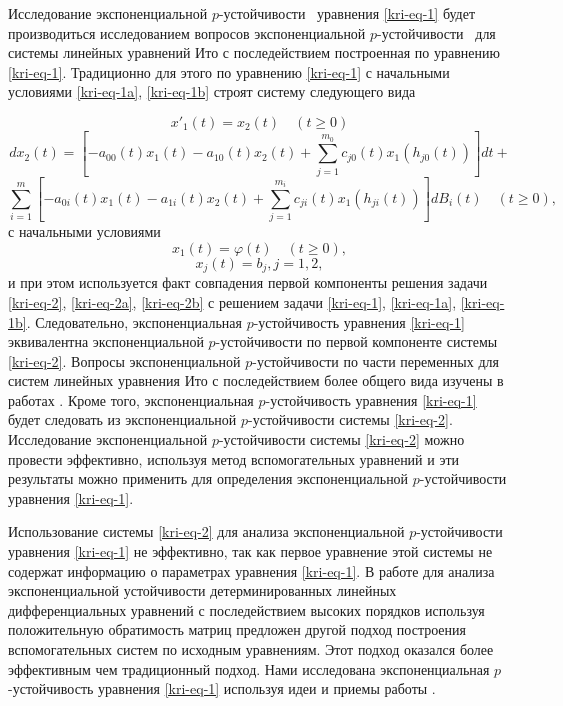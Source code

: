 Исследование экспоненциальной  $p${}-устойчивости \ уравнения \eqref{kri-eq-1} будет производиться исследованием вопросов
экспоненциальной  $p${}-устойчивости \ для системы линейных уравнений Ито с последействием построенная по уравнению
\eqref{kri-eq-1}. Традиционно для этого по уравнению \eqref{kri-eq-1} с начальными условиями \eqref{kri-eq-1a}, \eqref{kri-eq-1b} строят систему следующего вида

\begin{equation*}
	x'_1(t) = x_2(t)\quad(t\ge0)
\end{equation*}
\begin{equation}\label{kri-eq-2}
	dx_2(t) = \left[-a_{00}(t)x_1(t) - a_{10}(t)x_2(t) + \sum_{j=1}^{m_0}c_{j0}(t)x_1(h_{j0}(t))\right]dt +
\end{equation}
\begin{equation*}
	\sum_{i=1}^{m} \left[-a_{0i}(t)x_1(t)-a_{1i}(t)x_2(t)+\sum_{j=1}^{m_i}c_{ji}(t)x_1(h_{ji}(t))\right]dB_i(t) \quad (t \ge 0),
\end{equation*}
с начальными условиями
\begin{equation}\label{kri-eq-2a}
	x_1(t)=\varphi (t)\quad(t\ge 0),
\end{equation}
\begin{equation}\label{kri-eq-2b}
	x_j(t)=b_j, j=1,2,
\end{equation}
и при этом используется факт совпадения первой компоненты решения задачи \eqref{kri-eq-2}, \eqref{kri-eq-2a}, \eqref{kri-eq-2b} с решением задачи \eqref{kri-eq-1}, \eqref{kri-eq-1a},
\eqref{kri-eq-1b}. Следовательно, экспоненциальная  $p$-\linebreak устойчивость уравнения \eqref{kri-eq-1} эквивалентна экспоненциальной
$p${}-устойчивости по первой компоненте системы \eqref{kri-eq-2}. Вопросы экспоненциальной  $p${}-устойчивости по части переменных
для систем линейных уравнения Ито с последействием более общего вида изучены в работах \cite{kri-bib-19, kri-bib-20}. Кроме того,
экспоненциальная  $p${}-устойчивость уравнения \eqref{kri-eq-1} будет следовать из экспоненциальной  $p${}-устойчивости системы \eqref{kri-eq-2}.
Исследование экспоненциальной  $p${}-устойчивости системы \eqref{kri-eq-2} можно провести эффективно, используя метод
вспомогательных уравнений и эти результаты можно применить для определения экспоненциальной  $p${}-устойчивости
уравнения \eqref{kri-eq-1}.

Использование системы \eqref{kri-eq-2} для анализа экспоненциальной  $p${}-устойчивости \linebreak уравнения \eqref{kri-eq-1} не эффективно, так как первое
уравнение этой системы не содержат информацию о параметрах уравнения \eqref{kri-eq-1}. В работе \cite{kri-bib-16} для анализа экспоненциальной
устойчивости детерминированных линейных дифференциальных уравнений с последействием высоких порядков используя
положительную обратимость матриц предложен другой подход построения вспомогательных систем по исходным уравнениям. Этот
подход оказался более эффективным чем традиционный подход. Нами исследована экспоненциальная  $p${}-устойчивость
уравнения \eqref{kri-eq-1} используя идеи и приемы работы \cite{kri-bib-16}.

